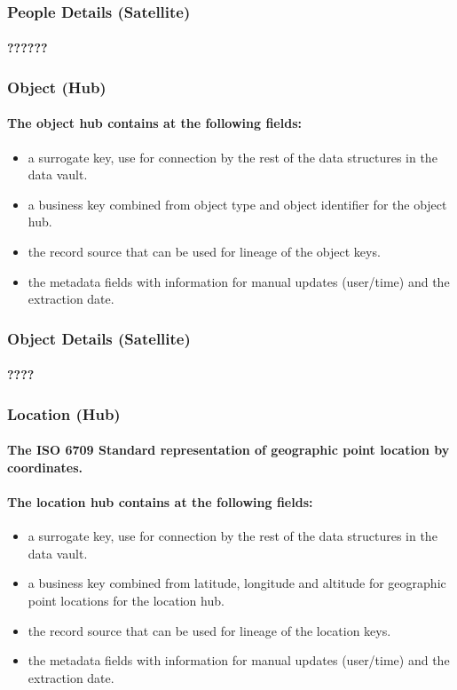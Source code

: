 \subsubsection{People Details (Satellite)}
\paragraph{??????}
\subsubsection{Object (Hub)}
\paragraph{The object hub contains at the following fields:}
\begin{itemize}
  \item{a surrogate key, use for connection by the rest of the data structures in the data vault.}
  \item{a business key combined from object type and object identifier for the object hub.}
  \item{the record source that can be used for lineage of the object keys.}
  \item{the metadata fields with information for manual updates (user/time) and the extraction date.}
\end{itemize}
\subsubsection{Object Details (Satellite)}
\paragraph{????}
\subsubsection{Location (Hub)}
\paragraph{The ISO 6709 Standard representation of geographic point location by coordinates.}
\paragraph{The location hub contains at the following fields:}
\begin{itemize}
  \item{a surrogate key, use for connection by the rest of the data structures in the data vault.}
  \item{a business key combined from latitude, longitude and altitude for geographic point locations for the location hub.}
  \item{the record source that can be used for lineage of the location keys.}
  \item{the metadata fields with information for manual updates (user/time) and the extraction date.}
\end{itemize}
